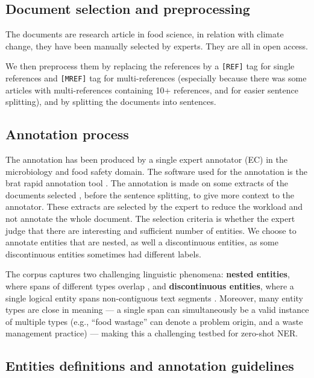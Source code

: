 \documentclass[11pt]{article}
\begin{document}
\subsection{Document selection and preprocessing}

The documents are research article in food science, in relation with climate change, they have been manually selected by experts. They are all in open access.

We then preprocess them by replacing the references by a \texttt{[REF]} tag for single references and \texttt{[MREF]} tag for multi-references (especially because there was some articles with multi-references containing 10+ references, and for easier sentence splitting), and by splitting the documents into sentences.

\subsection{Annotation process}

The annotation has been produced by a single expert annotator (EC) in the microbiology and food safety domain. The software used for the annotation is the brat rapid annotation tool \cite{stenetorpBratWebbasedTool2012}. The annotation is made on some extracts of the documents selected , before the sentence splitting, to give more context to the annotator. These extracts are selected by the expert to reduce the workload and not annotate the whole document. The selection criteria is whether the expert judge that there are interesting and sufficient number of entities. We choose to annotate entities that are nested, as well a discontinuous entities, as some discontinuous entities sometimes had different labels.

The corpus captures two challenging linguistic phenomena: \textbf{nested entities}, where spans of different types overlap \cite{}, and \textbf{discontinuous entities}, where a single logical entity spans non-contiguous text segments \cite{}. Moreover, many entity types are close in meaning — a single span can simultaneously be a valid instance of multiple types (e.g., ``food wastage'' can denote a problem origin, and a waste management practice) — making this a challenging testbed for zero-shot NER.

\subsection{Entities definitions and annotation guidelines}
\end{document}

